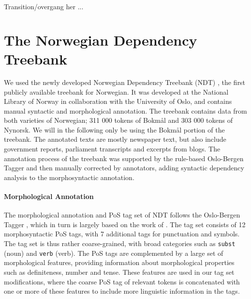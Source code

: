 \documentclass[11pt,a4paper]{article}
\begin{document}
Transition/overgang her ...

\section{The Norwegian Dependency Treebank}
\label{sec:data}
We used the newly developed Norwegian Dependency Treebank (NDT)
\cite{Sol:Skj:Ovr:14}, the first publicly available treebank for
Norwegian. It was developed at the National Library of Norway in
collaboration with the University of Oslo, and contains manual
syntactic and morphological annotation. The treebank contains data
from both varieties of Norwegian; 311 000 tokens of Bokmål and 303 000
tokens of Nynorsk. We will in the following only be using the Bokmål
portion of the treebank. The annotated texts are mostly newspaper
text, but also include government reports, parliament transcripts and
excerpts from blogs. The annotation process of the treebank was supported by
the rule-based Oslo-Bergen Tagger \cite{Hag:Joh:Nok:00} and then manually
corrected by annotators, adding syntactic dependency analysis to the
morphosyntactic annotation.

\paragraph{Morphological Annotation}
The morphological annotation and PoS tag set of NDT follows the Oslo-Bergen
Tagger \cite{Hag:Joh:Nok:00,Sol:13}, which in turn is largely based on the work
of . The tag set consists of 12 morphosyntactic PoS
tags, with 7 additional tags for punctuation and symbols. The tag set is thus
rather coarse-grained, with broad categories such as \texttt{subst} (noun) and
\texttt{verb} (verb). The PoS tags are complemented by a large set of
morphological features, providing information about morphological properties such as
definiteness, number and tense. These features are used in our tag set
modifications, where the coarse PoS tag of relevant tokens is concatenated with
one or more of these features to include more linguistic information in the
tags.
\end{document}

